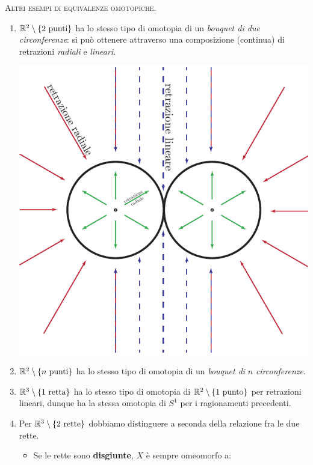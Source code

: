 \begin{examples}\textsc{Altri esempi di equivalenze omotopiche.}
	\begin{enumerate}
		\item $\mathbb{R}^2\setminus\left\{2\text{ punti}\right\}$ ha lo stesso tipo di omotopia di un \textit{bouquet di due circonferenze}: si può ottenere attraverso una composizione (continua) di retrazioni \textit{radiali} e \textit{lineari}.
		\begin{center}
						\includegraphics[trim=0cm 0cm 0cm 0cm,clip,scale=0.75]{images/bouquetconstruction.pdf}
		\end{center}	
		\item $\mathbb{R}^2\setminus\left\{n\text{ punti}\right\}$ ha lo stesso tipo di omotopia di un \textit{bouquet di} $n$ \textit{circonferenze}.
		\item $\mathbb{R}^3\setminus\left\{1\text{ retta}\right\}$ ha lo stesso tipo di omotopia di $\mathbb{R}^2\setminus\left\{1\text{ punto}\right\}$ per retrazioni lineari, dunque ha la stessa omotopia di $S^1$ per i ragionamenti precedenti.
		\item Per $\mathbb{R}^3\setminus\left\{2\text{ rette}\right\}$ dobbiamo distinguere a seconda della relazione fra le due rette.
		\begin{itemize}
			\item Se le rette sono \textbf{disgiunte}, $X$ è sempre omeomorfo a:

\end{itemize}
\end{enumerate}
\end{examples}
